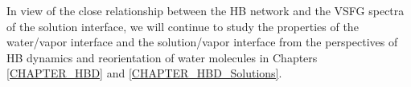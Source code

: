 In view of the close relationship between the HB network and the VSFG spectra of the solution interface, 
we will continue to study the properties of the water/vapor interface and the solution/vapor interface from the perspectives of HB dynamics and reorientation of water molecules 
in Chapters \ref{CHAPTER_HBD} and \ref{CHAPTER_HBD_Solutions}.

%
 
%
%

